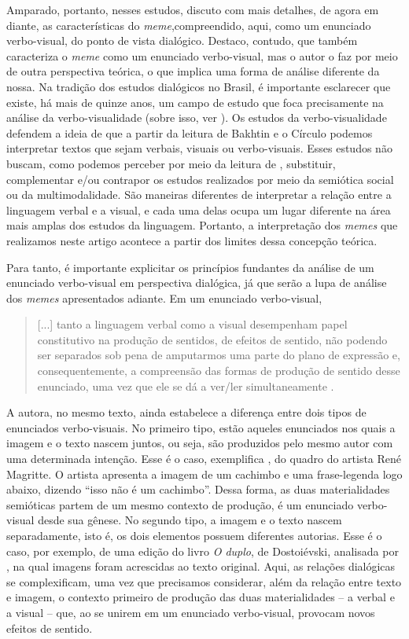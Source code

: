 \documentclass[portuguese]{textolivre}
\begin{document}
Amparado, portanto, nesses estudos, discuto com mais detalhes, de agora em diante, as características do \textit{meme},compreendido, aqui, como um enunciado verbo-visual, do ponto de vista dialógico. Destaco, contudo, que \textcite{souzajunior2016lado} também caracteriza o \textit{meme} como um enunciado verbo-visual, mas o autor o faz por meio de outra perspectiva teórica, o que implica uma forma de análise diferente da nossa. Na tradição dos estudos dialógicos no Brasil, é importante esclarecer que existe, há mais de quinze anos, um campo de estudo que foca precisamente na análise da verbo-visualidade (sobre isso, ver \textcite{brait2013olhar}). Os estudos da verbo-visualidade defendem a ideia de que a partir da leitura de Bakhtin e o Círculo podemos interpretar textos que sejam verbais, visuais ou verbo-visuais. Esses estudos não buscam, como podemos perceber por meio da leitura de \textcite{brait2013olhar}, substituir, complementar e/ou contrapor os estudos realizados por meio da semiótica social ou da multimodalidade. São maneiras diferentes de interpretar a relação entre a linguagem verbal e a visual, e cada uma delas ocupa um lugar diferente na área mais amplas dos estudos da linguagem. Portanto, a interpretação dos \textit{memes} que realizamos neste artigo acontece a partir dos limites dessa concepção teórica.
	
Para tanto, é importante explicitar os princípios fundantes da análise de um enunciado verbo-visual em perspectiva dialógica, já que serão a lupa de análise dos \textit{memes} apresentados adiante. Em um enunciado verbo-visual,

\begin{quote}
[...] tanto a linguagem verbal como a visual desempenham papel constitutivo na produção de sentidos, de efeitos de sentido, não podendo ser separados sob pena de amputarmos uma parte do plano de expressão e, consequentemente, a compreensão das formas de produção de sentido desse enunciado, uma vez que ele se dá a ver/ler simultaneamente \cite[p.~44]{brait2013olhar}.
\end{quote}	
	
	
A autora, no mesmo texto, ainda estabelece a diferença entre dois tipos de enunciados verbo-visuais. No primeiro tipo, estão aqueles enunciados nos quais a imagem e o texto nascem juntos, ou seja, são produzidos pelo mesmo autor com uma determinada intenção. Esse é o caso, exemplifica \textcite{brait2013olhar}, do quadro do artista René Magritte. O artista apresenta a imagem de um cachimbo e uma frase-legenda logo abaixo, dizendo “isso não é um cachimbo”. Dessa forma, as duas materialidades semióticas partem de um mesmo contexto de produção, é um enunciado verbo-visual desde sua gênese. No segundo tipo, a imagem e o texto nascem separadamente, isto é, os dois elementos possuem diferentes autorias. Esse é o caso, por exemplo, de uma edição do livro \textit{O duplo}, de Dostoiévski, analisada por \textcite{brait2013olhar}, na qual imagens foram acrescidas ao texto original. Aqui, as relações dialógicas se complexificam, uma vez que precisamos considerar, além da relação entre texto e imagem, o contexto primeiro de produção das duas materialidades – a verbal e a visual – que, ao se unirem em um enunciado verbo-visual, provocam novos efeitos de sentido. 
	
\end{document}
